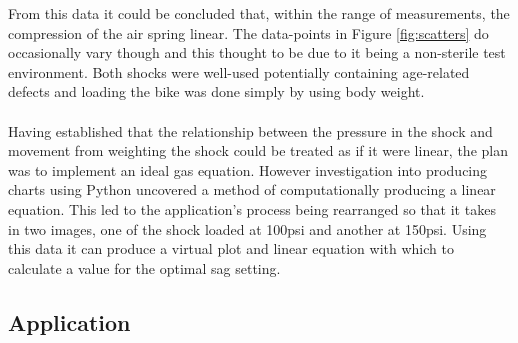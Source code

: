 			From this data it could be concluded that, within the range of measurements, the compression of the air spring linear. The data-points in Figure \ref{fig:scatters} do occasionally vary though and this thought to be due to it being a non-sterile test environment. Both shocks were well-used potentially containing age-related defects and loading the bike was done simply by using body weight.
			\\\\
			Having established that the relationship between the pressure in the shock and movement from weighting the shock could be treated as if it were linear, the plan was to implement an ideal gas equation. However investigation into producing charts using Python uncovered a method of computationally producing a linear equation. This led to the application’s process being rearranged so that it takes in two images, one of the shock loaded at 100psi and another at 150psi. Using this data it can produce a virtual plot and linear equation with which to calculate a value for the optimal sag setting.
	\subsection{Application}
